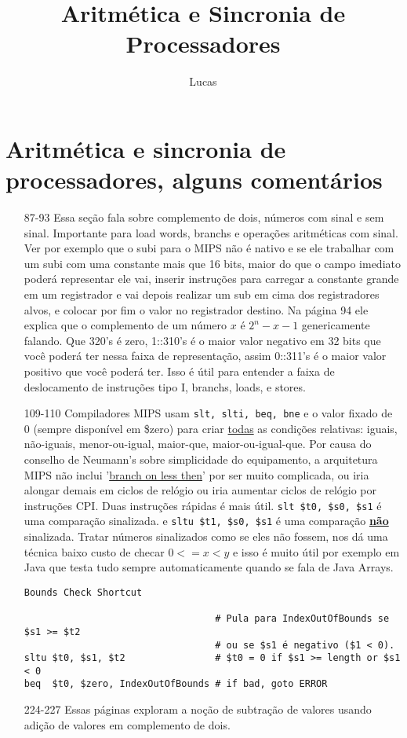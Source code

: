\documentclass{article}
\author{Lucas}
\title{Aritmética e Sincronia de Processadores}
\begin{document}
\maketitle

\section{Aritmética e sincronia de processadores, alguns comentários}

\begin{enumerate}

\item[87-93] Essa seção fala sobre complemento de dois, números com sinal e sem
sinal. Importante para load words, branchs e operações aritméticas com sinal.
Ver por exemplo que o subi para o MIPS não é nativo e se ele trabalhar com um
subi com uma constante mais que 16 bits, maior do que o campo imediato poderá
representar ele vai, inserir instruções para carregar a constante grande em um
registrador e vai depois realizar um sub em cima dos registradores alvos, e
colocar por fim o valor no registrador destino. Na página 94 ele explica que o
complemento de um número $x$ é $2^{n} - x - 1$ genericamente falando. Que
32{0's} é zero, 1::31{0's} é o maior valor negativo em 32 bits que você poderá
ter nessa faixa de representação, assim 0::31{1's} é o maior valor positivo que
você poderá ter. Isso é útil para entender a faixa de deslocamento de instruções
tipo I, branchs, loads, e stores.
\item[109-110] Compiladores MIPS usam \verb|slt, slti, beq, bne| e o valor
fixado de 0 (sempre disponível em \$zero) para criar \underline{todas} as
condições relativas: iguais, não-iguais, menor-ou-igual, maior-que,
maior-ou-igual-que. Por causa do conselho de Neumann's sobre simplicidade do
equipamento, a arquitetura MIPS não inclui '\underline{branch on less then}' por
ser muito complicada, ou iria alongar demais em ciclos de relógio ou iria
aumentar ciclos de relógio por instruções CPI. Duas instruções rápidas é mais
útil. \verb|slt $t0, $s0, $s1| é uma comparação sinalizada. e
\verb|sltu $t1, $s0, $s1| é uma comparação \textbf{\underline{não}} sinalizada.
Tratar números sinalizados como se eles não fossem, nos dá uma técnica baixo 
custo de checar $0<=x<y$ e isso é muito útil por exemplo em Java que testa tudo 
sempre automaticamente quando se fala de Java Arrays.
\begin{verbatim}
Bounds Check Shortcut

                                  # Pula para IndexOutOfBounds se $s1 >= $t2
                                  # ou se $s1 é negativo ($1 < 0).
sltu $t0, $s1, $t2                # $t0 = 0 if $s1 >= length or $s1 < 0
beq  $t0, $zero, IndexOutOfBounds # if bad, goto ERROR
\end{verbatim}
\item[224-227] Essas páginas exploram a noção de subtração de valores usando 
adição de valores em complemento de dois.


\end{enumerate}
\end{document}
